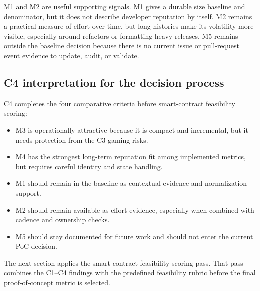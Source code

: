 M1 and M2 are useful supporting signals. M1 gives a durable size baseline and denominator, but it does not describe
developer reputation by itself. M2 remains a practical measure of effort over time, but long histories make its
volatility more visible, especially around refactors or formatting-heavy releases. M5 remains outside the baseline
decision because there is no current issue or pull-request event evidence to update, audit, or validate.

\subsection{C4 interpretation for the decision process}
\label{sec:c4_interpretation}

C4 completes the four comparative criteria before smart-contract feasibility scoring:
\begin{itemize}[leftmargin=*]
  \item M3 is operationally attractive because it is compact and incremental, but it needs protection from the C3 gaming risks.
  \item M4 has the strongest long-term reputation fit among implemented metrics, but requires careful identity and state handling.
  \item M1 should remain in the baseline as contextual evidence and normalization support.
  \item M2 should remain available as effort evidence, especially when combined with cadence and ownership checks.
  \item M5 should stay documented for future work and should not enter the current PoC decision.
\end{itemize}

The next section applies the smart-contract feasibility scoring pass. That pass combines the C1--C4 findings with
the predefined feasibility rubric before the final proof-of-concept metric is selected.
